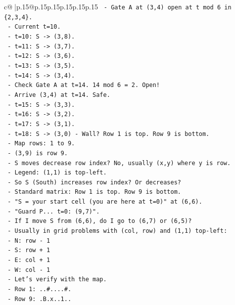 \documentclass{article}
\begin{document}
{\begin{supertabular}{c@{$\;$}|p{.15\linewidth}@{}p{.15\linewidth}p{.15\linewidth}p{.15\linewidth}p{.15\linewidth}p{.15\linewidth}}
{{{\texttt{  {-} Gate A at (3,4) open at t mod 6 in \{2,3,4\}.} \\
\texttt{  {-} Current t=10.} \\
\texttt{  {-} t=10: S {-}> (3,8).} \\
\texttt{  {-} t=11: S {-}> (3,7).} \\
\texttt{  {-} t=12: S {-}> (3,6).} \\
\texttt{  {-} t=13: S {-}> (3,5).} \\
\texttt{  {-} t=14: S {-}> (3,4).} \\
\texttt{    {-} Check Gate A at t=14. 14 mod 6 = 2. Open!} \\
\texttt{    {-} Arrive (3,4) at t=14. Safe.} \\
\texttt{  {-} t=15: S {-}> (3,3).} \\
\texttt{  {-} t=16: S {-}> (3,2).} \\
\texttt{  {-} t=17: S {-}> (3,1).} \\
\texttt{  {-} t=18: S {-}> (3,0) {-} Wall? Row 1 is top. Row 9 is bottom.} \\
\texttt{  {-} Map rows: 1 to 9.} \\
\texttt{  {-} (3,9) is row 9.} \\
\texttt{  {-} S moves decrease row index? No, usually (x,y) where y is row.} \\
\texttt{  {-} Legend: (1,1) is top{-}left.} \\
\texttt{  {-} So S (South) increases row index? Or decreases?} \\
\texttt{  {-} Standard matrix: Row 1 is top. Row 9 is bottom.} \\
\texttt{  {-} "S = your start cell (you are here at t=0)" at (6,6).} \\
\texttt{  {-} "Guard P... t=0: (9,7)".} \\
\texttt{  {-} If I move S from (6,6), do I go to (6,7) or (6,5)?} \\
\texttt{  {-} Usually in grid problems with (col, row) and (1,1) top{-}left:} \\
\texttt{    {-} N: row {-} 1} \\
\texttt{    {-} S: row + 1} \\
\texttt{    {-} E: col + 1} \\
\texttt{    {-} W: col {-} 1} \\
\texttt{  {-} Let's verify with the map.} \\
\texttt{  {-} Row 1: ..\#....\#.} \\
\texttt{  {-} Row 9: .B.x..1..} \\
}}}
\end{supertabular}}
\end{document}
